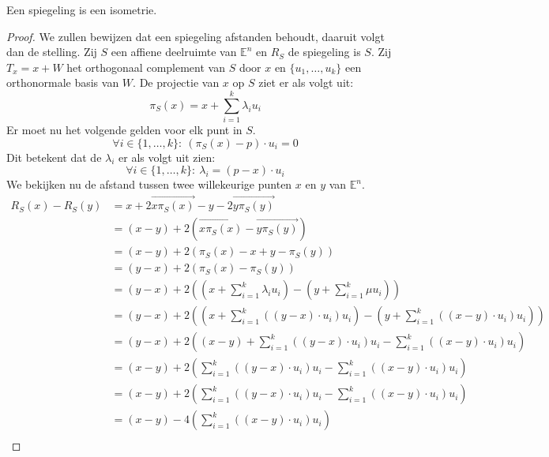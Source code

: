 \documentclass[main.tex]{subfiles}
\begin{document}
\begin{st}
  \examen
  \label{st:spiegeling-isometrie}
  Een spiegeling is een isometrie.

  \begin{proof}
    We zullen bewijzen dat een spiegeling afstanden behoudt, daaruit volgt dan de stelling.
    Zij $S$ een affiene deelruimte van $\mathbb{E}^{n}$ en $R_{S}$ de spiegeling is $S$.
    Zij $T_{x}=x+W$ het orthogonaal complement van $S$ door $x$ en $\{u_{1},\dotsc,u_{k}\}$ een orthonormale basis van $W$.
    De projectie van $x$ op $S$ ziet er als volgt uit:
    \[ \pi_{S}(x) = x+\sum_{i=1}^{k}\lambda_{i}u_{i} \]
    Er moet nu het volgende gelden voor elk punt in $S$.
    \[ \forall i\in \{1,\dotsc,k\}:\ (\pi_{S}(x) -p)\cdot u_{i} = 0 \]
    Dit betekent dat de $\lambda_{i}$ er als volgt uit zien:\waarom
    \[ \forall i\in \{1,\dotsc,k\}:\ \lambda_{i} = (p-x)\cdot u_{i}\]
    We bekijken nu de afstand tussen twee willekeurige punten $x$ en $y$ van $\mathbb{E}^{n}$.
    \[
    \begin{array}{rll}
      R_{S}(x) - R_{S}(y) &= x + 2\overrightarrow{x\pi_{S}(x)} - y - 2\overrightarrow{y\pi_{S}(y)} &\\
                         &= (x-y) + 2(\overrightarrow{x\pi_{S}(x)} -\overrightarrow{y\pi_{S}(y)}) &\\
                         &= (x-y) + 2(\pi_{S}(x)-x + y-\pi_{S}(y)) &\\
                         &= (y-x) + 2(\pi_{S}(x)-\pi_{S}(y)) &\\
                         &= (y-x) + 2((x+\sum_{i=1}^{k}\lambda_{i}u_{i})-(y+\sum_{i=1}^{k}\mu u_{i})) &\\
                         &= (y-x) + 2((x+\sum_{i=1}^{k}((y-x)\cdot u_{i})u_{i})-(y+\sum_{i=1}^{k}((x-y)\cdot u_{i})u_{i})) &\\
                         &= (y-x) + 2((x-y) + \sum_{i=1}^{k}((y-x)\cdot u_{i})u_{i} - \sum_{i=1}^{k}((x-y)\cdot u_{i})u_{i}) &\\
                         &= (x-y) + 2(\sum_{i=1}^{k}((y-x)\cdot u_{i})u_{i} - \sum_{i=1}^{k}((x-y)\cdot u_{i})u_{i}) &\\
                         &= (x-y) + 2(\sum_{i=1}^{k}((y-x)\cdot u_{i})u_{i} - \sum_{i=1}^{k}((x-y)\cdot u_{i})u_{i}) &\\
                         &= (x-y) - 4(\sum_{i=1}^{k}((x-y)\cdot u_{i})u_{i} ) &\\
    \end{array}
    \]
  \end{proof}
\end{st}
\end{document}
